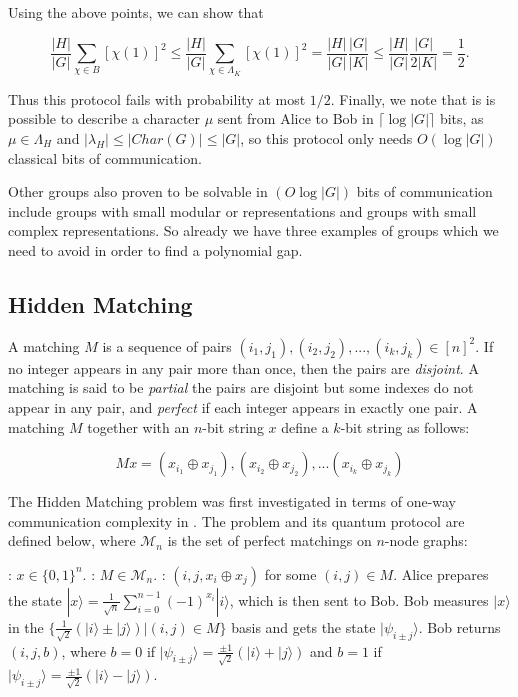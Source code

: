 \documentclass[a4paper]{article}
\begin{document}
        Using the above points, we can show that

        $$\frac{|H|}{|G|}\sum_{\chi \in B}[\chi(1)]^2 \leq \frac{|H|}{|G|}\sum_{\chi \in \Lambda_K}[\chi(1)]^2 = \frac{|H|}{|G|}\frac{|G|}{|K|} \leq \frac{|H|}{|G|}\frac{|G|}{2|K|} = \frac{1}{2}.$$

        Thus this protocol fails with probability at most $1/2$. Finally, we note that is is possible to describe a character $\mu$ sent from Alice to Bob in $\lceil\log|G|\rceil$ bits, as $\mu \in \Lambda_H$ and $|\lambda_H| \leq |Char(G)| \leq |G|$, so this protocol only needs $O(\log |G|)$ classical bits of communication.

        Other groups also proven to be solvable in $(O\log|G|)$ bits of communication include groups with small modular or representations and groups with small complex representations. So already we have three examples of groups which we need to avoid in order to find a polynomial gap.

        \subsection{Hidden Matching}
        \label{sec:hidden-matching}

        A matching $M$ is a sequence of pairs $(i_1, j_1), (i_2, j_2),...,(i_k, j_k) \in [n]^2$. If no integer appears in any pair more than once, then the pairs are {\em disjoint}. A matching is said to be {\em partial} the pairs are disjoint but some indexes do not appear in any pair, and {\em perfect} if each integer appears in exactly one pair. A matching $M$ together with an $n$-bit string $x$ define a $k$-bit string as follows:

        $$Mx = (x_{i_1} \oplus x_{j_1}), (x_{i_2} \oplus x_{j_2}), ... (x_{i_k} \oplus x_{j_k})$$

        The Hidden Matching problem was first investigated in terms of one-way communication complexity in \cite{doi:10.1137/060651835}. The problem and its quantum protocol are defined below, where $\mathcal{M}_n$ is the set of perfect matchings on $n$-node graphs:

        \begin{codebox}
            \zi {}: $x \in \{0,1\}^n$.
            \zi {}: $M \in \mathcal{M}_n$.
            \zi {}: $(i, j, x_i\oplus x_j)$ for some $(i, j) \in M$.
            \li Alice prepares the state $|x\rangle = \frac{1}{\sqrt{n}}\sum_{i = 0}^{n - 1}(-1)^{x_i}|i\rangle$, which is then sent to Bob.
            \li Bob measures $|x\rangle$ in the $\{\frac{1}{\sqrt{2}}(|i\rangle\pm|j\rangle)|(i, j) \in M\}$ basis and gets the state $|\psi_{i\pm j}\rangle$.
            \li Bob returns $(i, j, b)$, where $b = 0$ if $|\psi_{i\pm j}\rangle = \frac{\pm 1}{\sqrt{2}}(|i\rangle+|j\rangle)$ and $b = 1$ if $|\psi_{i\pm j}\rangle = \frac{\pm 1}{\sqrt{2}}(|i\rangle-|j\rangle)$.
        \end{codebox}
\end{document}
